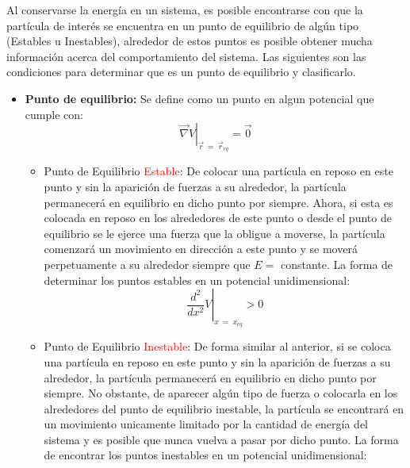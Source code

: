 \documentclass[/home/hernan-barquero/Documents/Apuntes_mecanica_teorica/main.tex]{subfiles}
\begin{document}
	\begin{definition}
		
		Al conservarse la energía en un sistema, es posible encontrarse con que la partícula de interés se encuentra en un punto de equilibrio de algún tipo (Estables u Inestables), alrededor de estos puntos es posible obtener mucha información acerca del comportamiento del sistema. Las siguientes son las condiciones para determinar que es un punto de equilibrio y clasificarlo.

		\begin{itemize}
			\item \textbf{Punto de equilibrio: } Se define como un punto en algun potencial que cumple con: \\ 
				\begin{equation}
				\left .  \vec{\nabla }V \right|_{\vec{r} \: = \: \vec{r}_{eq}} = \vec{0}
				\end{equation}
			\begin{itemize}
				\item Punto de Equilibrio \textcolor{red}{Estable}: De colocar una partícula en reposo en este punto y sin la aparición de fuerzas a su alrededor, la partícula permanecerá en equilibrio en dicho punto por siempre. Ahora, si esta es colocada en reposo en los alrededores de este punto o desde el punto de equilibrio se le ejerce una fuerza que la obligue a moverse, la partícula comenzará un movimiento en dirección a este punto y se moverá perpetuamente a su alrededor siempre que $E =$ constante. La forma de determinar los puntos estables en un potencial unidimensional: \\ 
				\begin{equation}
					\left .  \frac{d^2}{dx^2}V \right|_{x \: = \: x_{eq}} > 0 
					\label{eq: puntoestable}
				\end{equation}
				\item Punto de Equilibrio \textcolor{red}{Inestable}: De forma similar al anterior, si se coloca una partícula en reposo en este punto y sin la aparición de fuerzas a su alrededor, la partícula permanecerá en equilibrio en dicho punto por siempre. No obstante, de aparecer algún tipo de fuerza o colocarla en los alrededores del punto de equilibrio inestable, la partícula se encontrará en un movimiento unicamente limitado por la cantidad de energía del sistema y es posible que nunca vuelva a pasar por dicho punto. La forma de encontrar los puntos inestables en un potencial unidimensional: \\  

\end{itemize}
\end{itemize}
\end{definition}
\end{document}
